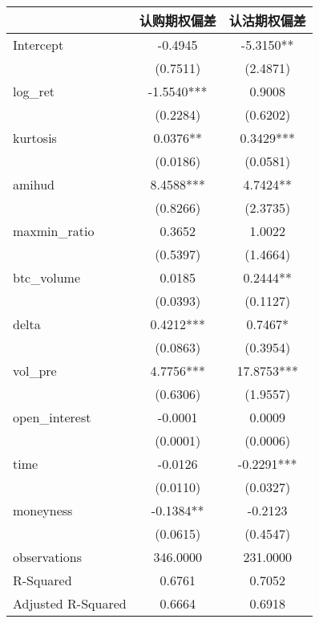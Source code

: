 \begin{tabular}{lcc}
\hline
                   &   认购期权偏差   &   认沽期权偏差    \\
\midrule
\midrule
Intercept          & -0.4945    & -5.3150**   \\
                   & (0.7511)   & (2.4871)    \\
log\_ret           & -1.5540*** & 0.9008      \\
                   & (0.2284)   & (0.6202)    \\
kurtosis           & 0.0376**   & 0.3429***   \\
                   & (0.0186)   & (0.0581)    \\
amihud             & 8.4588***  & 4.7424**    \\
                   & (0.8266)   & (2.3735)    \\
maxmin\_ratio      & 0.3652     & 1.0022      \\
                   & (0.5397)   & (1.4664)    \\
btc\_volume        & 0.0185     & 0.2444**    \\
                   & (0.0393)   & (0.1127)    \\
delta              & 0.4212***  & 0.7467*     \\
                   & (0.0863)   & (0.3954)    \\
vol\_pre           & 4.7756***  & 17.8753***  \\
                   & (0.6306)   & (1.9557)    \\
open\_interest     & -0.0001    & 0.0009      \\
                   & (0.0001)   & (0.0006)    \\
time               & -0.0126    & -0.2291***  \\
                   & (0.0110)   & (0.0327)    \\
moneyness          & -0.1384**  & -0.2123     \\
                   & (0.0615)   & (0.4547)    \\
observations       & 346.0000   & 231.0000    \\
R-Squared          & 0.6761     & 0.7052      \\
Adjusted R-Squared & 0.6664     & 0.6918      \\
\hline
\end{tabular}